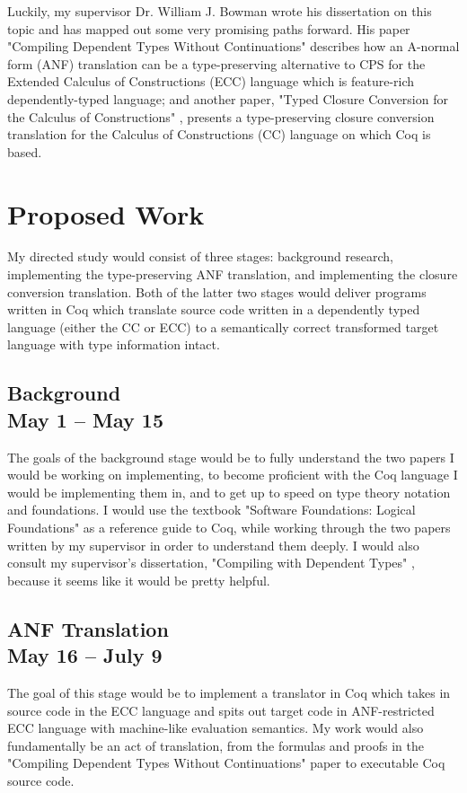 \documentclass[sigconf,nonacm=true,10pt]{acmart}
\begin{document}
Luckily, my supervisor Dr. William J. Bowman wrote his dissertation on this topic and has mapped out some very promising paths forward. His paper "Compiling Dependent Types Without Continuations" \cite{bowman_ahmed_2019} describes how an A-normal form (ANF) translation can be a type-preserving alternative to CPS for the Extended Calculus of Constructions (ECC) language which is feature-rich dependently-typed language; and another paper, "Typed Closure Conversion for the Calculus of Constructions" \cite{bowman_ahmed_2018}, presents a type-preserving closure conversion translation for the Calculus of Constructions (CC) language on which Coq is based.

\section{Proposed Work}

My directed study would consist of three stages: background research, implementing the type-preserving ANF translation, and implementing the closure conversion translation. Both of the latter two stages would deliver programs written in Coq which translate source code written in a dependently typed language (either the CC or ECC) to a semantically correct transformed target language with type information intact.
\subsection[Background\\  May 1 -- May 15]{Background\\ \large{May 1 -- May 15}}
The goals of the background stage would be to fully understand the two papers I would be working on implementing, to become proficient with the Coq language I would be implementing them in, and to get up to speed on type theory notation and foundations. I would use the textbook "Software Foundations: Logical Foundations" as a reference guide to Coq, while working through the two papers written by my supervisor in order to understand them deeply. I would also consult my supervisor's dissertation, "Compiling with Dependent Types" \cite{bowman_2019}, because it seems like it would be pretty helpful.
\subsection[ANF Translation\\  May 16 -- July 9]{ANF Translation\\ \large{ May 16 -- July 9}}
The goal of this stage would be to implement a translator in Coq which takes in source code in the ECC language and spits out target code in ANF-restricted ECC language with machine-like evaluation semantics. My work would also fundamentally be an act of translation, from the formulas and proofs in the "Compiling Dependent Types Without Continuations" paper to executable Coq source code.
\end{document}
